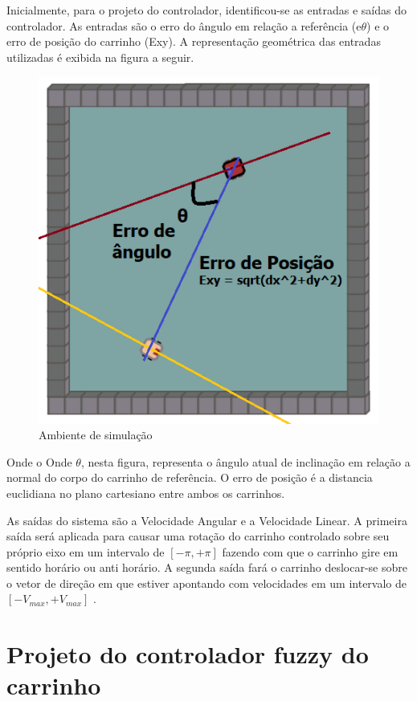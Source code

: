 Inicialmente, para o projeto do controlador, identificou-se as entradas e saídas do controlador. As entradas são o erro do ângulo em relação a referência (e$\theta$) e o erro de posição do carrinho (Exy). A representação geométrica das entradas utilizadas é exibida na figura a seguir.

\begin{figure}[H] 
    \centering
    \includegraphics[scale=0.5]{imagens/carrinho_erros.png}
    \caption{Ambiente de simulação}
\end{figure}

Onde o Onde $\theta$, nesta figura, representa o ângulo atual de inclinação em relação a normal do corpo do carrinho de referência. O erro de posição é a distancia euclidiana no plano cartesiano entre ambos os carrinhos.

As saídas do sistema são a Velocidade Angular e a Velocidade Linear. A primeira saída será aplicada para causar uma rotação do carrinho controlado sobre seu próprio eixo em um intervalo de $[-\pi,+\pi]$ fazendo com que o carrinho gire em sentido horário ou anti horário. A segunda saída fará o carrinho deslocar-se sobre o vetor de direção em que estiver apontando com velocidades em um intervalo de $[-V_{max},+V_{max}]$ . 

\section{Projeto do controlador fuzzy do carrinho}
